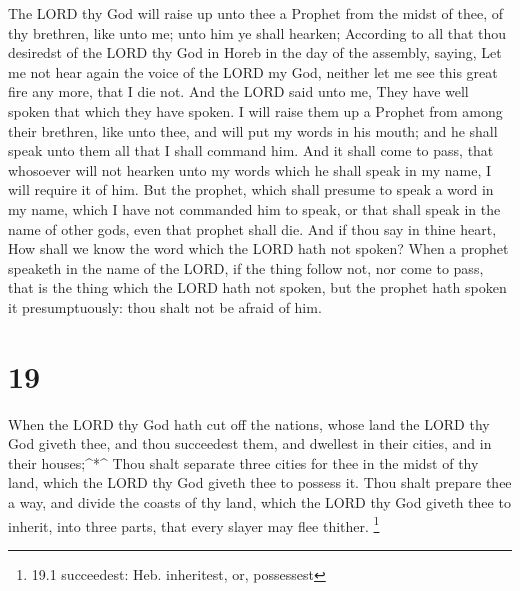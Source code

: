  The LORD thy God will raise up unto thee a Prophet from
the midst of thee, of thy brethren, like unto me; unto him ye shall
hearken;  According to all that thou desiredst of the LORD
thy God in Horeb in the day of the assembly, saying, Let me not hear
again the voice of the LORD my God, neither let me see this great fire
any more, that I die not.  And the LORD said unto me, They
have well spoken that which they have spoken.  I will raise
them up a Prophet from among their brethren, like unto thee, and will
put my words in his mouth; and he shall speak unto them all that I shall
command him.  And it shall come to pass, that whosoever
will not hearken unto my words which he shall speak in my name, I will
require it of him.  But the prophet, which shall presume to
speak a word in my name, which I have not commanded him to speak, or
that shall speak in the name of other gods, even that prophet shall die.
 And if thou say in thine heart, How shall we know the word
which the LORD hath not spoken?  When a prophet speaketh in
the name of the LORD, if the thing follow not, nor come to pass, that is
the thing which the LORD hath not spoken, but the prophet hath spoken it
presumptuously: thou shalt not be afraid of him.

\hypertarget{section-18}{%
\section{19}\label{section-18}}

 When the LORD thy God hath cut off the nations, whose land
the LORD thy God giveth thee, and thou succeedest them, and dwellest in
their cities, and in their houses;\^{}*\^{}  Thou shalt
separate three cities for thee in the midst of thy land, which the LORD
thy God giveth thee to possess it.  Thou shalt prepare thee
a way, and divide the coasts of thy land, which the LORD thy God giveth
thee to inherit, into three parts, that every slayer may flee thither.
\footnote{19.1 succeedest: Heb. inheritest, or, possessest}


